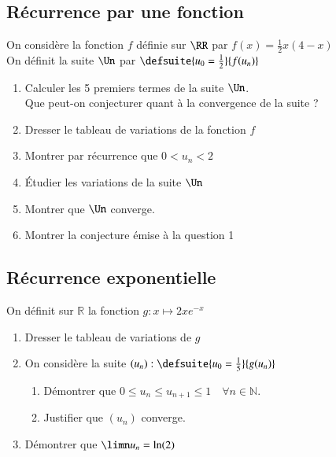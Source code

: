 \documentclass[oneside,12pt]{article}          %
\begin{document}
\subsection{Récurrence par une fonction}
On considère la fonction $f$ définie sur $\RR$ par $f(x)=\frac{1}{2}x(4-x)$ \\
On définit la suite $\Un$ par $\defsuite{u_0=\frac{1}{2}}{f(u_n)}$
\begin{enumerate}
    \item Calculer les 5 premiers termes de la suite $\Un$.\\
    Que peut-on conjecturer quant à la convergence de la suite ?
    \item Dresser le tableau de variations de la fonction $f$
    \item Montrer par récurrence que $0< u_n< 2$
    \item Étudier les variations de la suite $\Un$
    \item Montrer que $\Un$ converge.
    \item Montrer la conjecture émise à la question 1
\end{enumerate}



\subsection{Récurrence exponentielle}
On définit sur $\mathbb{R}$ la fonction $g : x \mapsto 2xe^{-x}$
\begin{enumerate}
    \item Dresser le tableau de variations de $g$
    \item On considère la suite $(u_n) : \defsuite{u_0=\frac{1}{5}}{g(u_n)}$
    \begin{enumerate}
        \item Démontrer que $0 \leq u_n \leq u_{n+1} \leq 1 \quad \forall n \in \mathbb{N}$.
        \item Justifier que $(u_n)$ converge.
    \end{enumerate}
    \item Démontrer que $\limn u_n = \ln(2)$
\end{enumerate}
\end{document}
